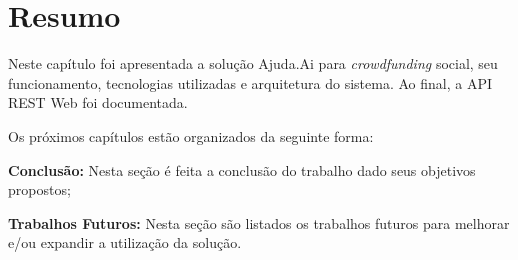\section*{Resumo} \label{sec:ajudaai:resumo}
Neste capítulo foi apresentada a solução Ajuda.Ai para \emph{crowdfunding} social, seu funcionamento, tecnologias utilizadas e arquitetura do sistema. Ao final, a API REST Web foi documentada.

Os próximos capítulos estão organizados da seguinte forma:

\begin{lista}
  \item \textbf{Conclusão:} Nesta seção é feita a conclusão do trabalho dado seus objetivos propostos;
  \item \textbf{Trabalhos Futuros:} Nesta seção são listados os trabalhos futuros para melhorar e/ou expandir a utilização da solução.
\end{lista}